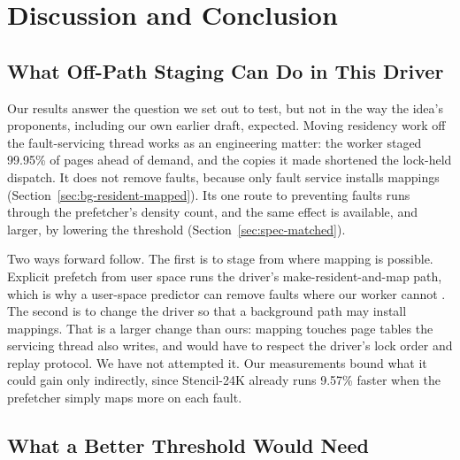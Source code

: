 
\section{Discussion and Conclusion}
\label{sec:discussion}

\subsection{What Off-Path Staging Can Do in This Driver}

Our results answer the question we set out to test, but not in the way the
idea's proponents, including our own earlier draft, expected. Moving residency
work off the fault-servicing thread works as an engineering matter: the worker
staged 99.95\% of pages ahead of demand, and the copies it made shortened the
lock-held dispatch. It does not remove faults, because only fault service
installs mappings (Section~\ref{sec:bg-resident-mapped}). Its one route to
preventing faults runs through the prefetcher's density count, and the same
effect is available, and larger, by lowering the threshold
(Section~\ref{sec:spec-matched}).

Two ways forward follow. The first is to stage from where mapping is possible.
Explicit prefetch from user space runs the driver's make-resident-and-map path,
which is why a user-space predictor can remove faults where our worker cannot
\cite{shen2026stride}. The second is to change the driver so that a background
path may install mappings. That is a larger change than ours: mapping touches
page tables the servicing thread also writes, and would have to respect the
driver's lock order and replay protocol. We have not attempted it. Our
measurements bound what it could gain only indirectly, since Stencil-24K
already runs 9.57\% faster when the prefetcher simply maps more on each fault.

\subsection{What a Better Threshold Would Need}

